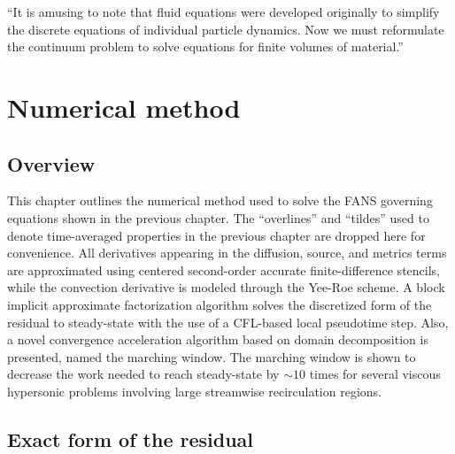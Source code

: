 \begin{chapterquote}
 ``It is amusing to note that fluid equations were developed originally to
 simplify the discrete equations of individual particle dynamics. Now we must
 reformulate the continuum problem to solve equations for finite volumes of material.''
\end{chapterquote}

\chapter{Numerical method}
\label{chapter:numerical_method}

\section{Overview}

This chapter outlines the numerical method used to solve the FANS governing equations
shown in the previous chapter. The ``overlines'' and
``tildes'' used to denote time-averaged properties in the previous chapter
are dropped here for convenience. All derivatives appearing in the diffusion,
source, and metrics terms are approximated using centered second-order accurate
finite-difference stencils, while the convection derivative is modeled through
the Yee-Roe \cite{book:1998:laney} scheme. A block implicit approximate factorization
algorithm solves the discretized form of the residual to steady-state with
the use of a CFL-based local pseudotime step. Also, a novel convergence acceleration
algorithm based on domain decomposition is presented, named the marching window.
The marching window is shown to decrease the work needed to
reach steady-state by $\sim 10$ times for several viscous hypersonic problems
involving large streamwise recirculation regions.



\section{Exact form of the residual}

